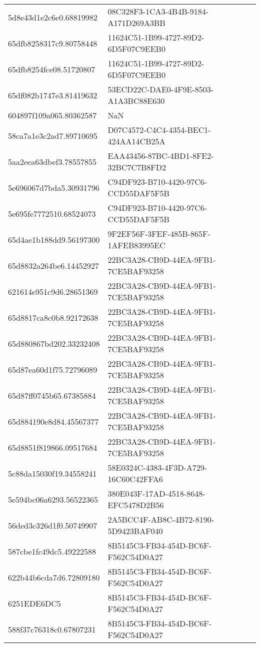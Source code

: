 \begin{tabular}{ll}
5d8e43d1e2c6e0.68819982 & 08C328F3-1CA3-4B4B-9184-A171D269A3BB \\
65dfb8258317c9.80758448 & 11624C51-1B99-4727-89D2-6D5F07C9EEB0 \\
65dfb8254fce08.51720807 & 11624C51-1B99-4727-89D2-6D5F07C9EEB0 \\
65df082b1747e3.81419632 & 53ECD22C-DAE0-4F9E-8503-A1A3BC88E630 \\
604897f109a065.80362587 & NaN \\
58ca7a1e3c2ad7.89710695 & D07C4572-C4C4-4354-BEC1-424AA14CB25A \\
5aa2eea63dbef3.78557855 & EAA43456-87BC-4BD1-8FE2-32BC7C7B8FD2 \\
5e696067d7bda5.30931796 & C94DF923-B710-4420-97C6-CCD55DAF5F5B \\
5e695fe7772510.68524073 & C94DF923-B710-4420-97C6-CCD55DAF5F5B \\
65d4ae1b188dd9.56197300 & 9F2EF56F-3FEF-485B-865F-1AFEB83995EC \\
65d8832a264be6.14452927 & 22BC3A28-CB9D-44EA-9FB1-7CE5BAF93258 \\
621614e951c9d6.28651369 & 22BC3A28-CB9D-44EA-9FB1-7CE5BAF93258 \\
65d8817ca8c0b8.92172638 & 22BC3A28-CB9D-44EA-9FB1-7CE5BAF93258 \\
65d880867bd202.33232408 & 22BC3A28-CB9D-44EA-9FB1-7CE5BAF93258 \\
65d87ea60d1f75.72796089 & 22BC3A28-CB9D-44EA-9FB1-7CE5BAF93258 \\
65d87ff0745b65.67385884 & 22BC3A28-CB9D-44EA-9FB1-7CE5BAF93258 \\
65d884190e8d84.45567377 & 22BC3A28-CB9D-44EA-9FB1-7CE5BAF93258 \\
65d8851f819866.09517684 & 22BC3A28-CB9D-44EA-9FB1-7CE5BAF93258 \\
5c88da15030f19.34558241 & 58E0324C-4383-4F3D-A729-16C60C42FFA6 \\
5e594bc06a6293.56522365 & 380E043F-17AD-4518-8648-EFC5478D2B56 \\
56ded3c326d1f0.50749907 & 2A5BCC4F-AB8C-4B72-8190-5D9423BAF040 \\
587cbe1fc49dc5.49222588 & 8B5145C3-FB34-454D-BC6F-F562C54D0A27 \\
622b44b6cda7d6.72809180 & 8B5145C3-FB34-454D-BC6F-F562C54D0A27 \\
6251EDE6DC5 & 8B5145C3-FB34-454D-BC6F-F562C54D0A27 \\
588f37c76318c0.67807231 & 8B5145C3-FB34-454D-BC6F-F562C54D0A27 \\

\end{tabular}
